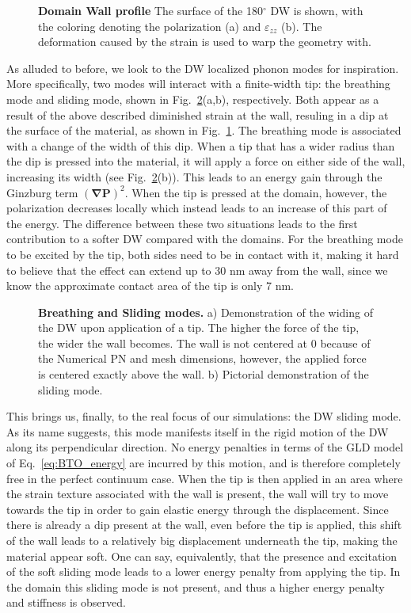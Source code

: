 \begin{figure}[h]
	\caption{\label{fig:BTO_wall} {\bf Domain Wall profile} The surface of the 180$^\circ$ DW is shown, with the coloring denoting the polarization (a) and $\varepsilon_{zz}$ (b). The deformation caused by the strain is used to warp the geometry with.}
\end{figure}
As alluded to before, we look to the DW localized phonon modes for inspiration.
More specifically, two modes will interact with a finite-width tip: the breathing mode and sliding mode, shown in Fig.~\ref{fig:BTO_breathing_sliding}(a,b), respectively.
Both appear as a result of the above described diminished strain at the wall, resuling in a dip at the surface of the material, as shown in Fig.~\ref{fig:BTO_wall}.
The breathing mode is associated with a change of the width of this dip.
When a tip that has a wider radius than the dip is pressed into the material, it will apply a force on either side of the wall, increasing its width (see Fig.~\ref{fig:BTO_breathing_sliding}(b)).
This leads to an energy gain through the Ginzburg term $(\bm{\nabla}\bm{P})^2$.
When the tip is pressed at the domain, however, the polarization decreases locally which instead leads to an increase of this part of the energy.
The difference between these two situations leads to the first contribution to a softer DW compared with the domains.
For the breathing mode to be excited by the tip, both sides need to be in contact with it, making it hard to believe that the effect can extend up to 30 nm away from the wall, since we know the approximate contact area of the tip is only 7 nm. 

\begin{figure}
	\caption{\label{fig:BTO_breathing_sliding}{\bf Breathing and Sliding modes.} a) Demonstration of the widing of the DW upon application of a tip. The higher the force of the tip, the wider the wall becomes. The wall is not centered at 0 because of the Numerical PN and mesh dimensions, however, the applied force is centered exactly above the wall. b) Pictorial demonstration of the sliding mode.}
\end{figure}


This brings us, finally, to the real focus of our simulations: the DW sliding mode.
As its name suggests, this mode manifests itself in the rigid motion of the DW along its perpendicular direction.
No energy penalties in terms of the GLD model of Eq.~\ref{eq:BTO_energy} are incurred by this motion, and is therefore completely free in the perfect continuum case.
When the tip is then applied in an area where the strain texture associated with the wall is present, the wall will try to move towards the tip in order to gain elastic energy through the displacement.
Since there is already a dip present at the wall, even before the tip is applied, this shift of the wall leads to a relatively big displacement underneath the tip, making the material appear soft.
One can say, equivalently, that the presence and excitation of the soft sliding mode leads to a lower energy penalty from applying the tip.
In the domain this sliding mode is not present, and thus a higher energy penalty and stiffness is observed.

